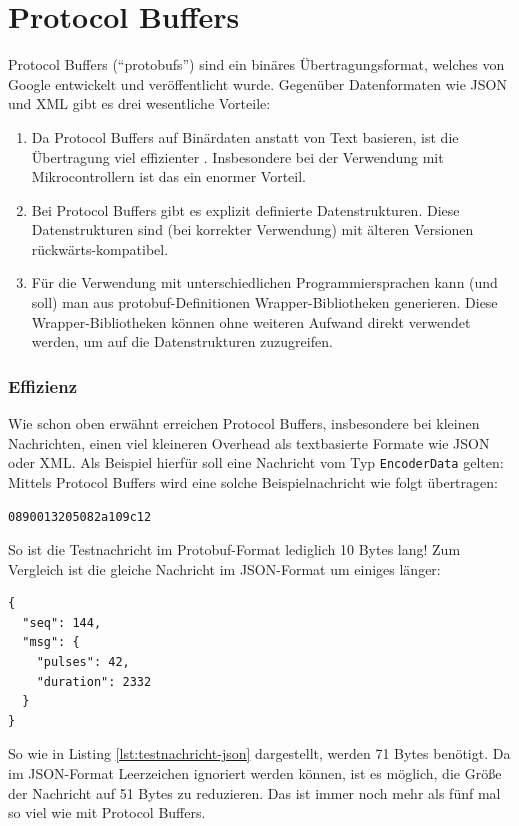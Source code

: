 \section{Protocol Buffers}
\label{subsec:ueberblick_protobufs}
Protocol Buffers \cite{protobufs} (``protobufs'') sind ein binäres Übertragungsformat,
welches von Google entwickelt und veröffentlicht wurde.
%
Gegenüber Datenformaten wie JSON und XML gibt es drei wesentliche Vorteile:
\begin{enumerate}
    \item Da Protocol Buffers auf Binärdaten anstatt von Text basieren,
    ist die Übertragung viel effizienter \cite{7765670}.
    Insbesondere bei der Verwendung mit Mikrocontrollern ist das ein enormer Vorteil.

    \item Bei Protocol Buffers gibt es explizit definierte Datenstrukturen.
    Diese Datenstrukturen sind (bei korrekter Verwendung) mit älteren Versionen rückwärts-kompatibel.

    \item Für die Verwendung mit unterschiedlichen Programmiersprachen kann (und soll) man aus protobuf-Definitionen
    Wrapper-Bibliotheken generieren.
    Diese Wrapper-Bibliotheken können ohne weiteren Aufwand direkt verwendet werden,
    um auf die Datenstrukturen zuzugreifen.
\end{enumerate}

\subsubsection{Effizienz}
Wie schon oben erwähnt erreichen Protocol Buffers,
insbesondere bei kleinen Nachrichten,
einen viel kleineren Overhead als textbasierte Formate wie JSON oder XML.
%
Als Beispiel hierfür soll eine Nachricht vom Typ \texttt{EncoderData} gelten:
%
Mittels Protocol Buffers wird eine solche Beispielnachricht wie folgt übertragen:
%
\begin{lstlisting}[label=lst:testnachricht-proto,caption=Testnachricht (Protobuf) in Hexadezimaldarstellung]
    0890013205082a109c12
\end{lstlisting}
So ist die Testnachricht im Protobuf-Format lediglich 10 Bytes lang!
%
Zum Vergleich ist die gleiche Nachricht im JSON-Format um einiges länger:
\begin{lstlisting}[label=lst:testnachricht-json,caption=Testnachricht (JSON) als formattierter String]
{
  "seq": 144,
  "msg": {
    "pulses": 42,
    "duration": 2332
  }
}
\end{lstlisting}
So wie in Listing \ref{lst:testnachricht-json} dargestellt,
werden 71 Bytes benötigt.
Da im JSON-Format Leerzeichen ignoriert werden können,
ist es möglich, die Größe der Nachricht auf 51 Bytes zu reduzieren.
%
Das ist immer noch mehr als fünf mal so viel wie mit Protocol Buffers.

